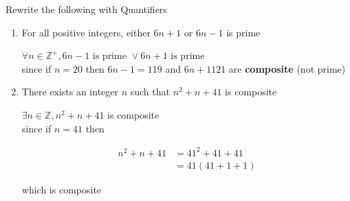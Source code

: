 \documentclass[../../Main.tex]{subfiles}
\begin{document}
\begin{example}
    Rewrite the following with Quantifiers

    \begin{enumerate}
        \item 
            For all positive integers, either $6n +1$ or $6n -1$ is prime
            \begin{solution}
                $\forall n \in \mathbb{Z}^+, 6n-1 \text{ is prime } \lor 6n + 1 \text{ is prime }$
                \\
                \FALSE since if $n = 20$ then $6n - 1 = 119$ and $6n + 1 121$ are \textbf{composite} (not prime)
            \end{solution}

        \item 
            There exists an integer $n$ such that $n^2 + n + 41$ is composite
            \begin{solution}
                $\exists n \in \mathbb{Z}, n^2 + n + 41$ is composite
                \\
                \TRUE since if $n = 41$ then 
                
                \begin{align*}
                    n^2 + n + 41 &= 41^2 + 41 + 41 \\
                    &= 41(41 + 1 + 1)
                \end{align*}

                \begin{center}
                    which is composite
                \end{center}
            \end{solution}

    \end{enumerate}
\end{example}

\end{document}
